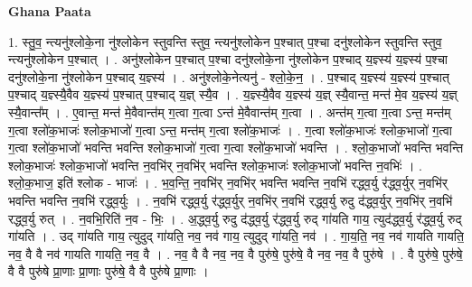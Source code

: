 \documentclass[17pt]{extarticle}
\begin{document}
\textbf{Ghana Paata } \newline

1. स्तु॒व॒ न्त्यनु॑श्लोके॒ना नु॑श्लोकेन स्तुवन्ति स्तुव॒ न्त्यनु॑श्लोकेन प॒श्चात् प॒श्चा दनु॑श्लोकेन स्तुवन्ति स्तुव॒ न्त्यनु॑श्लोकेन प॒श्चात् । . अनु॑श्लोकेन प॒श्चात् प॒श्चा दनु॑श्लोके॒ना नु॑श्लोकेन प॒श्चाद् य॒ज्ञ्स्य॑ य॒ज्ञ्स्य॑ प॒श्चा दनु॑श्लोके॒ना नु॑श्लोकेन प॒श्चाद् य॒ज्ञ्स्य॑ । . अनु॑श्लोके॒नेत्यनु॑ - श्लो॒के॒न॒ । . प॒श्चाद् य॒ज्ञ्स्य॑ य॒ज्ञ्स्य॑ प॒श्चात् प॒श्चाद् य॒ज्ञ्स्यै॒वैव य॒ज्ञ्स्य॑ प॒श्चात् प॒श्चाद् य॒ज्ञ् स्यै॒व । . य॒ज्ञ्स्यै॒वैव य॒ज्ञ्स्य॑ य॒ज्ञ् स्यै॒वान्त॒ मन्त॑ मे॒व य॒ज्ञ्स्य॑ य॒ज्ञ् स्यै॒वान्त᳚म् । . ए॒वान्त॒ मन्त॑ मे॒वैवान्त॑म् ग॒त्वा ग॒त्वा ऽन्त॑ मे॒वैवान्त॑म् ग॒त्वा । . अन्त॑म् ग॒त्वा ग॒त्वा ऽन्त॒ मन्त॑म् ग॒त्वा श्लो॑क॒भाजः॑ श्लोक॒भाजो॑ ग॒त्वा ऽन्त॒ मन्त॑म् ग॒त्वा श्लो॑क॒भाजः॑ । . ग॒त्वा श्लो॑क॒भाजः॑ श्लोक॒भाजो॑ ग॒त्वा ग॒त्वा श्लो॑क॒भाजो॑ भवन्ति भवन्ति श्लोक॒भाजो॑ ग॒त्वा ग॒त्वा श्लो॑क॒भाजो॑ भवन्ति । . श्लो॒क॒भाजो॑ भवन्ति भवन्ति श्लोक॒भाजः॑ श्लोक॒भाजो॑ भवन्ति न॒वभि॑र् न॒वभि॑र् भवन्ति श्लोक॒भाजः॑ श्लोक॒भाजो॑ भवन्ति न॒वभिः॑ । . श्लो॒क॒भाज॒ इति॑ श्लोक - भाजः॑ । . भ॒व॒न्ति॒ न॒वभि॑र् न॒वभि॑र् भवन्ति भवन्ति न॒वभि॑ रद्ध्व॒र्यु र॑द्ध्व॒र्युर् न॒वभि॑र् भवन्ति भवन्ति न॒वभि॑ रद्ध्व॒र्युः । . न॒वभि॑ रद्ध्व॒र्यु र॑द्ध्व॒र्युर् न॒वभि॑र् न॒वभि॑ रद्ध्व॒र्यु रुदु द॑द्ध्व॒र्युर् न॒वभि॑र् न॒वभि॑ रद्ध्व॒र्यु रुत् । . न॒वभि॒रिति॑ न॒व - भिः॒ । . अ॒द्ध्व॒र्यु रुदु द॑द्ध्व॒र्यु र॑द्ध्व॒र्यु रुद् गा॑यति गाय॒ त्युद॑द्ध्व॒र्यु र॑द्ध्व॒र्यु रुद् गा॑यति । . उद् गा॑यति गाय॒ त्युदुद् गा॑यति॒ नव॒ नव॑ गाय॒ त्युदुद् गा॑यति॒ नव॑ । . गा॒य॒ति॒ नव॒ नव॑ गायति गायति॒ नव॒ वै वै नव॑ गायति गायति॒ नव॒ वै । . नव॒ वै वै नव॒ नव॒ वै पुरु॑षे॒ पुरु॑षे॒ वै नव॒ नव॒ वै पुरु॑षे । . वै पुरु॑षे॒ पुरु॑षे॒ वै वै पुरु॑षे प्रा॒णाः प्रा॒णाः पुरु॑षे॒ वै वै पुरु॑षे प्रा॒णाः । \newline
\end{document}
